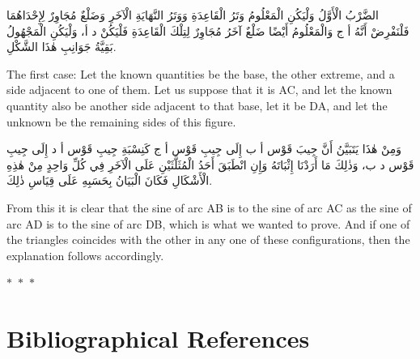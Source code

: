 \documentclass[11pt,a4paper]{article}
\theoremstyle{plain}
\theoremstyle{definition}
\theoremstyle{remark}
\newcommand{\ar}[1]{{\arabicfont\beginR #1\endR}}
\newcommand{\bilingualpair}[2]{%
  \par\noindent
  \begin{minipage}[t]{0.48\textwidth}
  #1
  \end{minipage}%
  \hfill
  \begin{minipage}[t]{0.48\textwidth}
  \vspace*{0pt}#2
  \end{minipage}\par\vspace{0.3cm}%
}
\newcommand{\ornament}{\begin{center}\textcolor{goldaccent}{$\ast$~$\ast$~$\ast$}\end{center}}
\begin{document}
\bilingualpair{\ar{الضَّرْبُ الْأَوَّلُ وَلْيَكُنِ الْمَعْلُومُ وَتَرُ الْقَاعِدَةِ وَوَتَرُ النَّهَايَةِ الْآخَرِ وَضَلْعٌ مُجَاوِرٌ لِإِحْدَاهُمَا فَلْنَفْرِضْ أَنَّهُ أ ج وَالْمَعْلُومُ أَيْضًا ضَلْعٌ آخَرُ مُجَاوِرٌ لِتِلْكَ الْقَاعِدَةِ فَلْيَكُنْ د أ، وَلْيَكُنِ الْمَجْهُولُ بَقِيَّةُ جَوَانِبِ هٰذَا الشَّكْلِ.}}{The first case: Let the known quantities be the base, the other extreme, and a side adjacent to one of them. Let us suppose that it is AC, and let the known quantity also be another side adjacent to that base, let it be DA, and let the unknown be the remaining sides of this figure.}

\vspace{0.3cm}

\bilingualpair{\ar{وَمِنْ هٰذَا يَتَبَيَّنُ أَنَّ جِيبَ قَوْس أ ب إِلَى جِيبِ قَوْس أ ج كَنِسْبَةِ جِيبِ قَوْس أ د إِلَى جِيبِ قَوْس د ب، وَذٰلِكَ مَا أَرَدْنَا إِثْبَاتَهُ وَإِنِ انْطَبَقَ أَحَدُ الْمُثَلَّثَيْنِ عَلَى الْآخَرِ فِي كُلِّ وَاحِدٍ مِنْ هٰذِهِ الْأَشْكَالِ فَكَانَ الْبَيَانُ بِحَسَبِهِ عَلَى قِيَاسِ ذٰلِكَ.}}{From this it is clear that the sine of arc AB is to the sine of arc AC as the sine of arc AD is to the sine of arc DB, which is what we wanted to prove. And if one of the triangles coincides with the other in any one of these configurations, then the explanation follows accordingly.}

\ornament

\clearpage
\section*{Bibliographical References}
\end{document}
